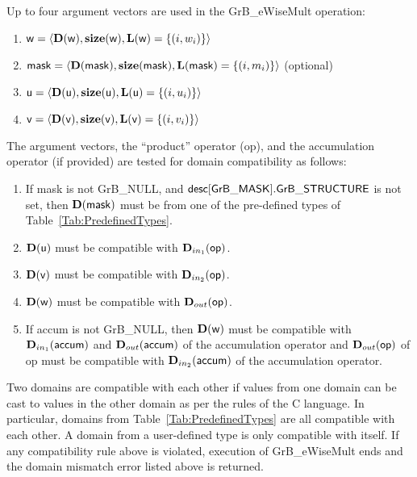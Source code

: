 Up to four argument vectors are used in the {\sf GrB\_eWiseMult} operation:
\begin{enumerate}
	\item ${\sf w} = \langle \bold{D}({\sf w}),\bold{size}({\sf w}),\bold{L}({\sf w}) = \{(i,w_i) \} \rangle$
	\item ${\sf mask} = \langle \bold{D}({\sf mask}),\bold{size}({\sf mask}),\bold{L}({\sf mask}) = \{(i,m_i) \} \rangle$ (optional)
	\item ${\sf u} = \langle \bold{D}({\sf u}),\bold{size}({\sf u}),\bold{L}({\sf u}) = \{(i,u_i) \} \rangle$
	\item ${\sf v} = \langle \bold{D}({\sf v}),\bold{size}({\sf v}),\bold{L}({\sf v}) = \{(i,v_i) \} \rangle$
\end{enumerate}

The argument vectors, the ``product'' operator ({\sf op}), and the accumulation 
operator (if provided) are tested for domain compatibility as follows:
\begin{enumerate}
	\item If {\sf mask} is not {\sf GrB\_NULL}, and ${\sf desc[GrB\_MASK].GrB\_STRUCTURE}$
    is not set, then $\bold{D}({\sf mask})$ must be from one of the pre-defined types of 
    Table~\ref{Tab:PredefinedTypes}.

	\item $\bold{D}({\sf u})$ must be compatible with $\mbox{$\mathbf{D}_{in_{1}}$}({\sf op})$.

	\item $\bold{D}({\sf v})$ must be compatible with $\mbox{$\mathbf{D}_{in_{2}}$}({\sf op})$.

	\item $\bold{D}({\sf w})$ must be compatible with $\mbox{$\mathbf{D}_{out}$}({\sf op})$.

	\item If {\sf accum} is not {\sf GrB\_NULL}, then $\bold{D}({\sf w})$ must be
    compatible with $\mbox{$\mathbf{D}_{in_{1}}$}({\sf accum})$ and $\mbox{$\mathbf{D}_{out}$}({\sf accum})$ of the accumulation operator and $\mbox{$\mathbf{D}_{out}$}({\sf op})$ of
    {\sf op} must be compatible with $\mbox{$\mathbf{D}_{in_{2}}$}({\sf accum})$ of the accumulation operator.
\end{enumerate}
Two domains are compatible with each other if values from one domain can be cast 
to values in the other domain as per the rules of the C language.
In particular, domains from Table~\ref{Tab:PredefinedTypes} are all compatible 
with each other. A domain from a user-defined type is only compatible with itself.
If any compatibility rule above is violated, execution of {\sf GrB\_eWiseMult} ends
and the domain mismatch error listed above is returned.

